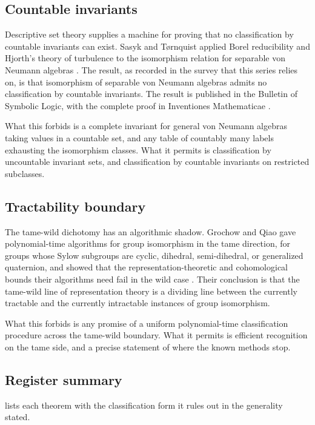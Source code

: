 \documentclass[11pt,letterpaper]{article}
\theoremstyle{definition}
\theoremstyle{remark}
\begin{document}
\subsection{Countable invariants}

Descriptive set theory supplies a machine for proving that no classification by countable invariants can exist. Sasyk and Tørnquist applied Borel reducibility and Hjorth's theory of turbulence to the isomorphism relation for separable von Neumann algebras \cite{sasyk2009}. The result, as recorded in the survey that this series relies on, is that isomorphism of separable von Neumann algebras admits no classification by countable invariants. The result is published in the Bulletin of Symbolic Logic, with the complete proof in Inventiones Mathematicae \cite{sasyk2009}.

What this forbids is a complete invariant for general von Neumann algebras taking values in a countable set, and any table of countably many labels exhausting the isomorphism classes. What it permits is classification by uncountable invariant sets, and classification by countable invariants on restricted subclasses.

\subsection{Tractability boundary}

The tame-wild dichotomy has an algorithmic shadow. Grochow and Qiao gave polynomial-time algorithms for group isomorphism in the tame direction, for groups whose Sylow subgroups are cyclic, dihedral, semi-dihedral, or generalized quaternion, and showed that the representation-theoretic and cohomological bounds their algorithms need fail in the wild case \cite{grochow2015}. Their conclusion is that the tame-wild line of representation theory is a dividing line between the currently tractable and the currently intractable instances of group isomorphism.

What this forbids is any promise of a uniform polynomial-time classification procedure across the tame-wild boundary. What it permits is efficient recognition on the tame side, and a precise statement of where the known methods stop.

\subsection{Register summary}

 lists each theorem with the classification form it rules out in the generality stated.
\end{document}
